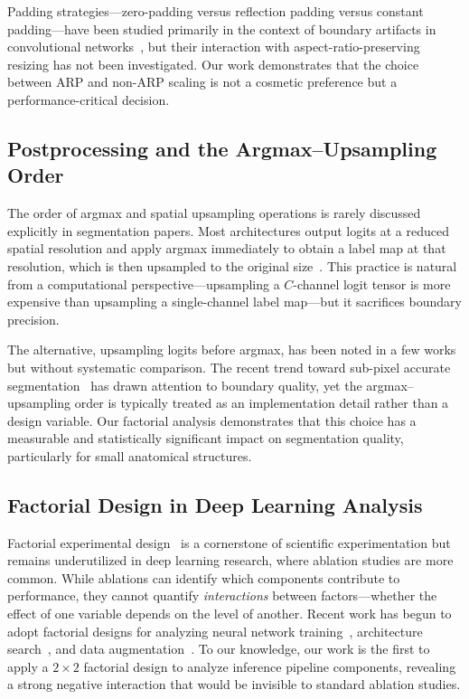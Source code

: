 \documentclass[10pt,twocolumn]{article}
\begin{document}
Padding strategies---zero-padding versus reflection padding versus constant padding---have been studied primarily in the context of boundary artifacts in convolutional networks~\cite{wang2022padding}, but their interaction with aspect-ratio-preserving resizing has not been investigated.
Our work demonstrates that the choice between ARP and non-ARP scaling is not a cosmetic preference but a performance-critical decision.

\subsection{Postprocessing and the Argmax--Upsampling Order}

The order of argmax and spatial upsampling operations is rarely discussed explicitly in segmentation papers.
Most architectures output logits at a reduced spatial resolution and apply argmax immediately to obtain a label map at that resolution, which is then upsampled to the original size~\cite{ronneberger2015u,cciccek2016nnunet}.
This practice is natural from a computational perspective---upsampling a $C$-channel logit tensor is more expensive than upsampling a single-channel label map---but it sacrifices boundary precision.

The alternative, upsampling logits before argmax, has been noted in a few works~\cite{bai2017deep,myronenko20193d} but without systematic comparison.
The recent trend toward sub-pixel accurate segmentation~\cite{cheng2022boundary} has drawn attention to boundary quality, yet the argmax--upsampling order is typically treated as an implementation detail rather than a design variable.
Our factorial analysis demonstrates that this choice has a measurable and statistically significant impact on segmentation quality, particularly for small anatomical structures.

\subsection{Factorial Design in Deep Learning Analysis}

Factorial experimental design~\cite{montgomery2017design} is a cornerstone of scientific experimentation but remains underutilized in deep learning research, where ablation studies are more common.
While ablations can identify which components contribute to performance, they cannot quantify \emph{interactions} between factors---whether the effect of one variable depends on the level of another.
Recent work has begun to adopt factorial designs for analyzing neural network training~\cite{melis2018state}, architecture search~\cite{liu2018darts}, and data augmentation~\cite{cubuk2019autoaugment}.
To our knowledge, our work is the first to apply a $2\times2$ factorial design to analyze inference pipeline components, revealing a strong negative interaction that would be invisible to standard ablation studies.
\end{document}
